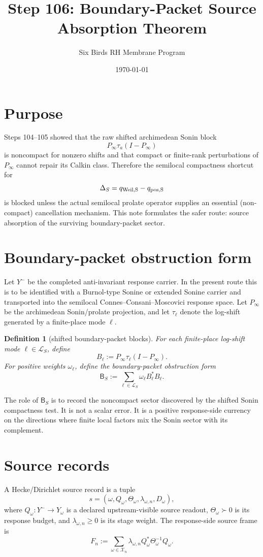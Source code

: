 \documentclass[11pt]{article}
\title{Step 106: Boundary-Packet Source Absorption Theorem}
\author{Six Birds RH Membrane Program}
\date{\today}
\newtheorem{definition}{Definition}
\begin{document}
\maketitle

\section{Purpose}
Steps 104--105 showed that the raw shifted archimedean Sonin block
\[
  P_\infty\tau_a(I-P_\infty)
\]
is noncompact for nonzero shifts and that compact or finite-rank perturbations of
\(P_\infty\) cannot repair its Calkin class.  Therefore the semilocal compactness
shortcut for
\[
  \Delta_S=q_{\rm Weil,S}-q_{\rm pos,S}
\]
is blocked unless the actual semilocal prolate operator supplies an essential
(non-compact) cancellation mechanism.  This note formulates the safer route:
source absorption of the surviving boundary-packet sector.

\section{Boundary-packet obstruction form}
Let \(Y^-\) be the completed anti-invariant response carrier.  In the present route
this is to be identified with a Burnol-type Sonine or extended Sonine carrier and
transported into the semilocal Connes--Consani--Moscovici response space.  Let
\(P_\infty\) be the archimedean Sonin/prolate projection, and let
\(\tau_\ell\) denote the log-shift generated by a finite-place mode \(\ell\).

\begin{definition}[shifted boundary-packet blocks]
For each finite-place log-shift mode \(\ell\in\mathcal L_S\), define
\[
  B_\ell:=P_\infty\tau_\ell(I-P_\infty).
\]
For positive weights \(\omega_\ell\), define the boundary-packet obstruction form
\[
  \mathsf B_S:=\sum_{\ell\in\mathcal L_S}\omega_\ell B_\ell^*B_\ell.
\]
\end{definition}

The role of \(\mathsf B_S\) is to record the noncompact sector discovered by the
shifted Sonin compactness test.  It is not a scalar error.  It is a positive response-side
currency on the directions where finite local factors mix the Sonin sector with its
complement.

\section{Source records}
A Hecke/Dirichlet source record is a tuple
\[
  s=(\omega,Q_\omega,\Theta_\omega,\lambda_{\omega,n},D_\omega),
\]
where \(Q_\omega:Y^-\to Y_\omega\) is a declared upstream-visible source readout,
\(\Theta_\omega\succ0\) is its response budget, and \(\lambda_{\omega,n}\ge0\) is its
stage weight.  The response-side source frame is
\[
  F_n:=\sum_{\omega\in\mathcal X_n}
  \lambda_{\omega,n}Q_\omega^*\Theta_\omega^{-1}Q_\omega.
\]
\end{document}
